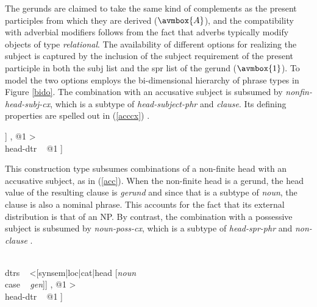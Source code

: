 \documentclass[output=paper]{langsci/langscibook}
\begin{document}
\noindent
The gerunds are claimed to take the same kind of complements 
as the present participles from which they are derived ($\avmbox{A}$), and
the compatibility with adverbial modifiers follows from the 
fact that adverbs typically modify objects of type {\it relational}. 
The availability of different options for realizing the subject is 
captured by the inclusion of the subject requirement of the present 
participle in both the {\sc subj} list and the {\sc spr} list of the gerund
($\avmbox{1}$). To model the two options \citet[15]{Malouf00} employs the  
bi-dimensional hierarchy of phrase types in Figure \ref{bido}. 
The combination with an accusative subject
is subsumed by {\it nonfin-head-subj-cx}, which is a subtype of 
{\it head-subject-phr} and {\it clause}. Its defining properties are 
spelled out in (\ref{acccx}) \citep[16]{Malouf00}. 

\begin{exe}
\ex\label{acccx} 
\begin{avm} 
[{\it nonfin-head-subj-cx\/}                  \\
 synsem|loc|cat|head|root ~ --                \\
 dtrs ~ <[synsem|loc|cat|head [{\it noun\/}   \\
                               case ~ {\it acc\/}]] , @1 > \\
 head-dtr ~ @1 ] 
\end{avm}
\end{exe} 

\noindent
This construction type subsumes combinations of a non-finite head with 
an accusative subject, as in (\ref{acc}). When the non-finite head is a gerund, 
the {\sc head} value of the resulting clause is {\it gerund\/} 
and since that is a subtype of {\it noun}, the clause is also a nominal phrase. 
This accounts for the fact that its external distribution is that of an NP.  
By contrast, the combination with a possessive subject
is subsumed by {\it noun-poss-cx}, which is a subtype of 
{\it head-spr-phr\/} and {\it non-clause\/} \citep[16]{Malouf00}.

\begin{exe} 
\ex\label{gencx} 
\begin{avm} 
[{\it noun-poss-cx\/}                                      \\
 synsem|loc [cat|head ~ {\it noun\/}                       \\
             content ~ {\it nom-obj\/}]                    \\
 dtrs ~ <[synsem|loc|cat|head [{\it noun\/}                \\
                               case ~ {\it gen\/}]] , @1 > \\
 head-dtr ~ @1 ] 
\end{avm}
\end{exe}
 
\end{document}

